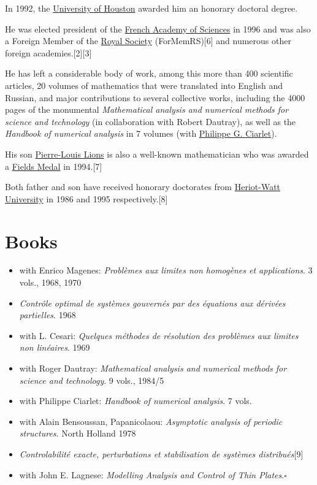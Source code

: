 \documentclass{book}
\numberwithin{equation}{section}
\begin{document}
In 1992, the \href{https://en.wikipedia.org/wiki/University_of_Houston}{University of Houston} awarded him an honorary doctoral degree.

He was elected president of the \href{https://en.wikipedia.org/wiki/French_Academy_of_Sciences}{French Academy of Sciences} in 1996 and was also a Foreign Member of the \href{https://en.wikipedia.org/wiki/Royal_Society}{Royal Society} (ForMemRS)[6] and numerous other foreign academies.[2][3]

%
He has left a considerable body of work, among this more than 400 scientific articles, 20 volumes of mathematics that were translated into English and Russian, and major contributions to several collective works, including the 4000 pages of the monumental \textit{Mathematical analysis and numerical methods for science and technology} (in collaboration with Robert Dautray), as well as the \textit{Handbook of numerical analysis} in 7 volumes (with \href{https://en.wikipedia.org/wiki/Philippe_G._Ciarlet}{Philippe G. Ciarlet}).

%
His son \href{https://en.wikipedia.org/wiki/Pierre-Louis_Lions}{Pierre-Louis Lions} is also a well-known mathematician who was awarded a \href{https://en.wikipedia.org/wiki/Fields_Medal}{Fields Medal} in 1994.[7]

Both father and son have received honorary doctorates from \href{https://en.wikipedia.org/wiki/Heriot-Watt_University}{Heriot-Watt University} in 1986 and 1995 respectively.[8]

\section{Books}
\begin{itemize}
    \item with Enrico Magenes: \textit{Problèmes aux limites non homogènes et applications}. 3 vols., 1968, 1970
    \item \textit{Contrôle optimal de systèmes gouvernés par des équations aux dérivées partielles}. 1968
    \item with L. Cesari: \textit{Quelques méthodes de résolution des problèmes aux limites non linéaires}. 1969
    \item with Roger Dautray: \textit{Mathematical analysis and numerical methods for science and technology}. 9 vols., 1984/5
    \item with Philippe Ciarlet: \textit{Handbook of numerical analysis}. 7 vols.
    \item with Alain Bensoussan, Papanicolaou: \textit{Asymptotic analysis of periodic structures}. North Holland 1978
    \item \textit{Controlabilité exacte, perturbations et stabilisation de systèmes distribués}[9]
    \item with John E. Lagnese: \textit{Modelling Analysis and Control of Thin Plates}.\hfill$\square$
\end{itemize}
\end{document}
